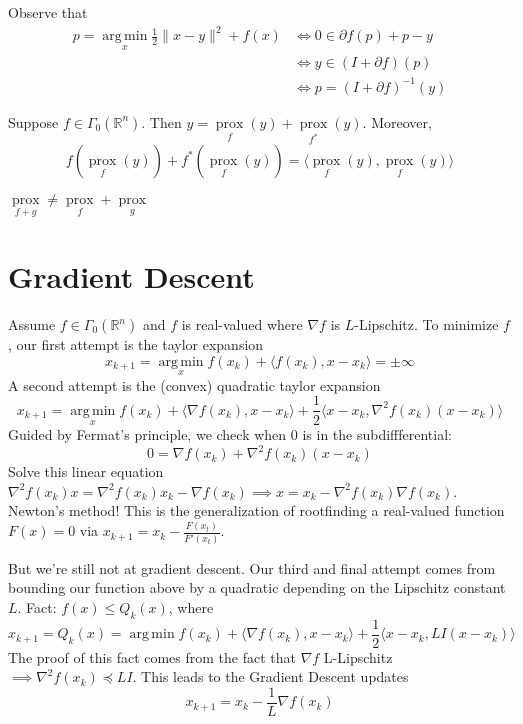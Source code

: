 \documentclass[english, 11pt]{article}
\DeclareMathOperator*{\argmin}{arg\,min}
\DeclareMathOperator*{\prox}{prox}
\begin{document}
 \begin{rem}
 Observe that
 \begin{align*}
 p = \argmin \limits_x \frac{1}{2} \|x-y\|^2 + f(x) &\iff 0 \in \partial f(p) + p-y \\
 &\iff y \in (I + \partial f)(p) \\
 &\iff p = (I + \partial f)^{-1}(y)
 \end{align*}
 \end{rem}
 
 \begin{thrm}
 Suppose $f \in \Gamma_0(\mathbb{R}^n)$. Then $y = \prox \limits_f(y) + \prox \limits_{f^*}(y)$. Moreover, 
 \[
   f\left(  \prox \limits_f(y) \right)  +   f^* \left(  \prox \limits_f(y) \right) = \langle  \prox \limits_f(y) ,   \prox \limits_f(y)  \rangle
 \]
 \end{thrm}
 
 
 \begin{rem}
 $\prox \limits_{f+g} \neq \prox \limits_f + \prox \limits_g$
 \end{rem}

\section{Gradient Descent}
Assume $f \in \Gamma_0(\mathbb{R}^n)$ and $f$ is real-valued where $\nabla f$ is $L$-Lipschitz.  To minimize $f$, our first attempt is the taylor expansion
\[
x_{k+1} = \argmin \limits_x f(x_k) + \langle f(x_k), x - x_k \rangle = \pm \infty
\]
A second attempt is the (convex) quadratic taylor expansion
\[
x_{k+1} = \argmin \limits_x f(x_k) + \langle \nabla f(x_k), x - x_k \rangle + \frac{1}{2} \langle x- x_k, \nabla^2 f(x_k) (x-x_k) \rangle
\]
Guided by Fermat's principle, we check when $0$ is in the subdiffferential:
\[
0 = \nabla f(x_k) + \nabla^2 f(x_k) (x-x_k)
\]
Solve this linear equation $\nabla^2 f(x_k) x = \nabla^2 f(x_k) x_k - \nabla f(x_k) 
\implies x = x_k - \nabla^2 f(x_k) \nabla f(x_k)$. Newton's method!
This is the generalization of rootfinding a real-valued function $F(x)=0$ via $x_{k+1} = x_k - \frac{F(x_t)}{F'(x_t)}$. 


But we're still not at gradient descent.
Our third and final attempt comes from bounding our function above by a quadratic depending on the Lipschitz constant $L$.
Fact: $f(x) \le Q_k(x)$, where 
\[
x_{k+1} = Q_k(x) = \argmin f(x_k) + \langle \nabla f(x_k), x-x_k \rangle + \frac{1}{2} \langle x-x_k, L I(x-x_k) \rangle
\]
The proof of this fact comes from the fact that $\nabla f$ L-Lipschitz $\implies \nabla^2 f(x_k) \preceq LI$. This leads to the Gradient Descent updates
\[
x_{k+1} = x_k - \frac{1}{L} \nabla f(x_k)
\]
\end{document}
